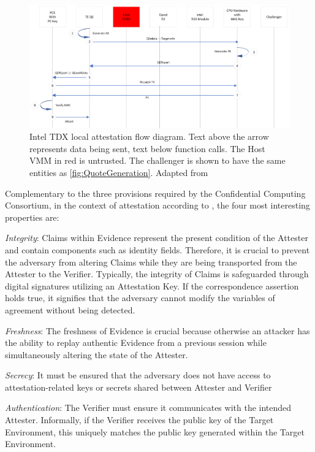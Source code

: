 \begin{figure}
\centering
\includegraphics[width=\textwidth]{figures/Local-Attestation.png}
\caption{Intel TDX local attestation flow diagram. Text above the arrow represents data being sent, text below function calls. The Host VMM in red is untrusted. The challenger is shown to have the same entities as \cref{fig:QuoteGeneration}. Adapted from \cite{sardar_formal_2023}}
\label{fig:local-attestation}
\end{figure}

Complementary to the three provisions required by the Confidential Computing Consortium, in the context of attestation according to \cite{sardar_demystifying_2021}, the four most interesting properties are:

\label{FourProperties}
\textit{Integrity}: Claims within Evidence represent the present condition of the Attester and contain components such as identity fields. Therefore, it is crucial to prevent the adversary from altering Claims while they are being transported from the Attester to the Verifier. Typically, the integrity of Claims is safeguarded through digital signatures utilizing an Attestation Key. If the correspondence assertion holds true, it signifies that the adversary cannot modify the variables of agreement without being detected. 

\textit{Freshness}: The freshness of Evidence is crucial because otherwise an attacker has the ability to replay authentic Evidence from a previous session while simultaneously altering the state of the Attester.

\textit{Secrecy}: It must be ensured that the adversary does not have access to attestation-related keys or secrets shared between Attester and Verifier

\textit{Authentication}: The Verifier must ensure it communicates with the intended Attester. Informally, if the Verifier receives the public key of the Target Environment, this uniquely matches the public key generated within the Target Environment.

